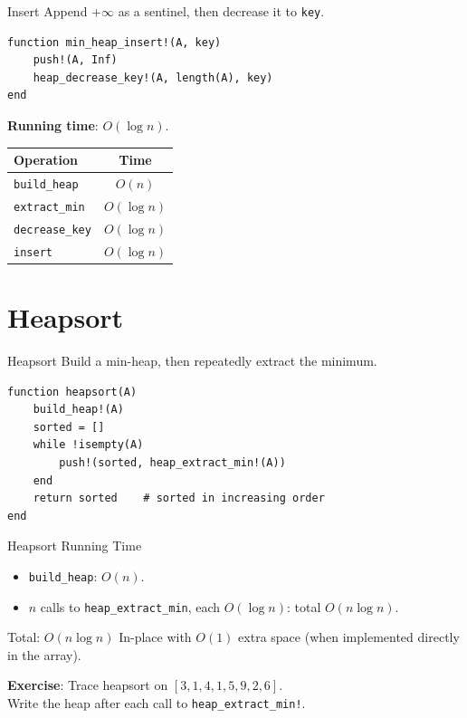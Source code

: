 \documentclass[10pt,aspectratio=169]{beamer}
\begin{document}
\begin{frame}[fragile]{Insert}
  Append $+\infty$ as a sentinel, then decrease it to \texttt{key}.

\begin{lstlisting}
function min_heap_insert!(A, key)
    push!(A, Inf)
    heap_decrease_key!(A, length(A), key)
end
\end{lstlisting}

  \bigskip
  \textbf{Running time}: $O(\log n)$.

  \bigskip
  \begin{center}
  \begin{tabular}{lc}
    \toprule
    Operation & Time \\
    \midrule
    \texttt{build\_heap} & $O(n)$ \\
    \texttt{extract\_min} & $O(\log n)$ \\
    \texttt{decrease\_key} & $O(\log n)$ \\
    \texttt{insert} & $O(\log n)$ \\
    \bottomrule
  \end{tabular}
  \end{center}
\end{frame}

\section{Heapsort}

\begin{frame}[fragile]{Heapsort}
  Build a min-heap, then repeatedly extract the minimum.

\begin{lstlisting}
function heapsort(A)
    build_heap!(A)
    sorted = []
    while !isempty(A)
        push!(sorted, heap_extract_min!(A))
    end
    return sorted    # sorted in increasing order
end
\end{lstlisting}
\end{frame}

\begin{frame}{Heapsort Running Time}
  \begin{itemize}
    \item \texttt{build\_heap}: $O(n)$.
    \item $n$ calls to \texttt{heap\_extract\_min}, each $O(\log n)$: total $O(n \log n)$.
  \end{itemize}

  \bigskip
  \begin{alertblock}{Total: $O(n \log n)$}
    In-place with $O(1)$ extra space (when implemented directly in the array).
  \end{alertblock}

  \bigskip
  \begin{center}
    \textbf{Exercise}: Trace heapsort on $[3, 1, 4, 1, 5, 9, 2, 6]$.\\
    Write the heap after each call to \texttt{heap\_extract\_min!}.
  \end{center}
\end{frame}
\end{document}
